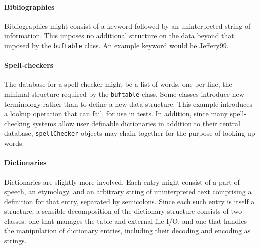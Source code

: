 \paragraph{Bibliographies}
Bibliographies might consist of a keyword followed by an uninterpreted
string of information. This imposes no additional structure on the data
beyond that imposed by the \texttt{buftable} class. An example keyword
would be Jeffery99.


\paragraph{Spell-checkers}
The database for a spell-checker might be a list of words, one per
line, the minimal structure required by the \texttt{buftable} class.
Some classes introduce new terminology rather
than to define a new data structure. This example introduces a lookup
operation that can fail, for use in tests. In addition, since many
spell-checking systems allow user definable dictionaries in addition to
their central database, \texttt{spellChecker} objects may chain
together for the purpose of looking up words.


\paragraph{Dictionaries}
Dictionaries are slightly more involved. Each entry might consist of a
part of speech, an etymology, and an arbitrary string of uninterpreted
text comprising a definition for that entry, separated by semicolons.
Since each such entry is itself a structure, a sensible decomposition
of the dictionary structure consists of two classes: one that manages
the table and external file I/O, and one that handles the manipulation
of dictionary entries, including their decoding and encoding as
strings.

